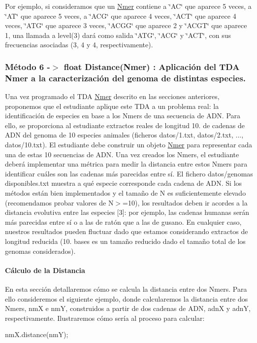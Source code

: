Por ejemplo, si consideramos que un \hyperlink{classNmer}{Nmer} contiene a \char`\"{}\+A\+C\char`\"{} que aparece 5 veces, a \char`\"{}\+A\+T\char`\"{} que aparece 5 veces, a \char`\"{}\+A\+C\+G\char`\"{} que aparece 4 veces, \char`\"{}\+A\+C\+T\char`\"{} que aparece 4 veces, \char`\"{}\+A\+T\+G\char`\"{} que aparece 3 veces, \char`\"{}\+A\+C\+G\+G\char`\"{} que aparece 2 y \char`\"{}\+A\+C\+G\+T\char`\"{} que aparece 1, una llamada a {\ttfamily level(3)} dará como salida \char`\"{}\+A\+T\+G\char`\"{}, \char`\"{}\+A\+C\+G\char`\"{} y \char`\"{}\+A\+C\+T\char`\"{}, con sus frecuencias asociadas (3, 4 y 4, respectivamente).\hypertarget{index_problemaBiologia}{}\subsubsection{Método 6 -\/$>$ float Distance(\+Nmer) \+: Aplicación del T\+D\+A Nmer a la caracterización del genoma de distintas especies.}\label{index_problemaBiologia}
Una vez programado el T\+DA \hyperlink{classNmer}{Nmer} descrito en las secciones anteriores, proponemos que el estudiante aplique este T\+DA a un problema real\+: la identificación de especies en base a los Nmers de una secuencia de A\+DN. Para ello, se proporciona al estudiante extractos reales de longitud 10. de cadenas de A\+DN del genoma de 10 especies animales (ficheros {\ttfamily datos/1.\+txt}, {\ttfamily datos/2.\+txt}, ..., {\ttfamily datos/10.\+txt}). El estudiante debe construir un objeto \hyperlink{classNmer}{Nmer} para representar cada una de estas 10 secuencias de A\+DN. Una vez creados los Nmers, el estudiante deberá implementar una métrica para medir la distancia entre estos Nmers para identificar cuáles son las cadenas más parecidas entre sí. El fichero {\ttfamily datos/genomas disponibles.\+txt} muestra a qué especie corresponde cada cadena de A\+DN. Si los métodos están bien implementados y el tamaño de N es suficientemente elevado (recomendamos probar valores de N$>$=10), los resultados deben ir acordes a la distancia evolutiva entre las especies \mbox{[}3\mbox{]}\+: por ejemplo, las cadenas humanas serán más parecidas entre sí o a las de ratón que a las de gusano. En cualquier caso, nuestros resultados pueden fluctuar dado que estamos considerando extractos de longitud reducida (10. bases es un tamaño reducido dado el tamaño total de los genomas considerados).\hypertarget{index_dist}{}\paragraph{Cálculo de la Distancia}\label{index_dist}
En esta sección detallaremos cómo se calcula la distancia entre dos Nmers. Para ello consideremos el siguiente ejemplo, donde calcularemos la distancia entre dos Nmers, nmX e nmY, construidos a partir de dos cadenas de A\+DN, adnX y adnY, respectivamente. Ilustraremos cómo sería al proceso para calcular\+: 
\begin{DoxyCode}
nmX.distance(nmY);
\end{DoxyCode}



